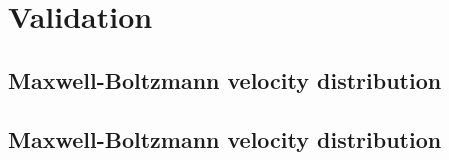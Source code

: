 \section{Validation}
\label{sec:md_code_validation}
\subsection{Maxwell-Boltzmann velocity distribution}
\subsection{Maxwell-Boltzmann velocity distribution}